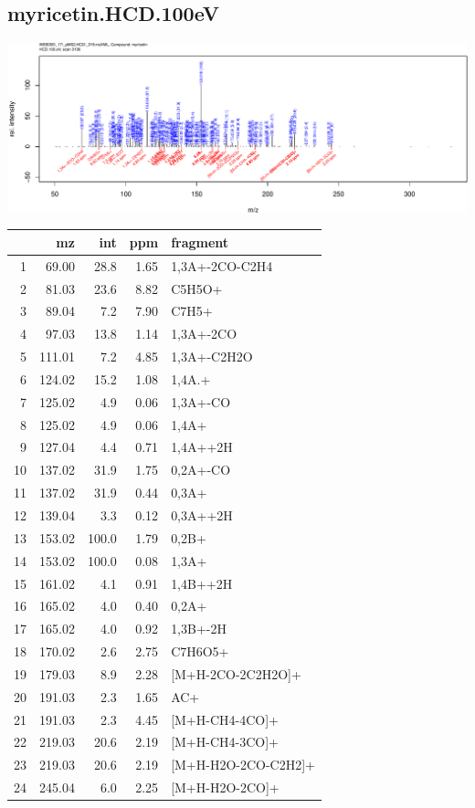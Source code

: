\documentclass[]{article}
\begin{document}
\clearpage\subsection{myricetin.HCD.100eV}
\includegraphics[width=\textwidth]{WEB350_files/figure-latex/unnamed-chunk-3-33}

\begin{table}[ht]
\centering
\begin{tabular}{rrrrl}
  \toprule
 & mz & int & ppm & fragment \\ 
  \midrule
1 & 69.00 & 28.8 & 1.65 & 1,3A+-2CO-C2H4 \\ 
  2 & 81.03 & 23.6 & 8.82 & C5H5O+ \\ 
  3 & 89.04 & 7.2 & 7.90 & C7H5+ \\ 
  4 & 97.03 & 13.8 & 1.14 & 1,3A+-2CO \\ 
  5 & 111.01 & 7.2 & 4.85 & 1,3A+-C2H2O \\ 
  6 & 124.02 & 15.2 & 1.08 & 1,4A.+ \\ 
  7 & 125.02 & 4.9 & 0.06 & 1,3A+-CO \\ 
  8 & 125.02 & 4.9 & 0.06 & 1,4A+ \\ 
  9 & 127.04 & 4.4 & 0.71 & 1,4A++2H \\ 
  10 & 137.02 & 31.9 & 1.75 & 0,2A+-CO \\ 
  11 & 137.02 & 31.9 & 0.44 & 0,3A+ \\ 
  12 & 139.04 & 3.3 & 0.12 & 0,3A++2H \\ 
  13 & 153.02 & 100.0 & 1.79 & 0,2B+ \\ 
  14 & 153.02 & 100.0 & 0.08 & 1,3A+ \\ 
  15 & 161.02 & 4.1 & 0.91 & 1,4B++2H \\ 
  16 & 165.02 & 4.0 & 0.40 & 0,2A+ \\ 
  17 & 165.02 & 4.0 & 0.92 & 1,3B+-2H \\ 
  18 & 170.02 & 2.6 & 2.75 & C7H6O5+ \\ 
  19 & 179.03 & 8.9 & 2.28 & [M+H-2CO-2C2H2O]+ \\ 
  20 & 191.03 & 2.3 & 1.65 & AC+ \\ 
  21 & 191.03 & 2.3 & 4.45 & [M+H-CH4-4CO]+ \\ 
  22 & 219.03 & 20.6 & 2.19 & [M+H-CH4-3CO]+ \\ 
  23 & 219.03 & 20.6 & 2.19 & [M+H-H2O-2CO-C2H2]+ \\ 
  24 & 245.04 & 6.0 & 2.25 & [M+H-H2O-2CO]+ \\ 
   \bottomrule
\end{tabular}
\end{table}
\end{document}
